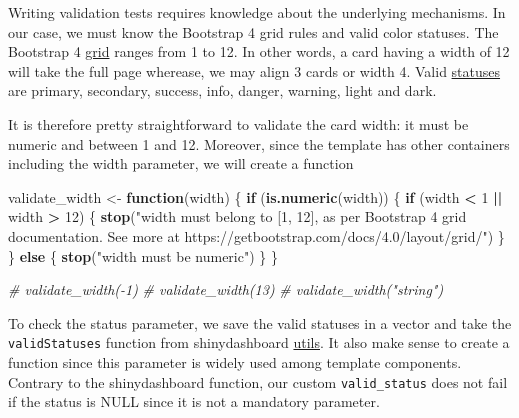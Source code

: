 \documentclass[
]{book}
\newenvironment{Shaded}{\begin{snugshade}}{\end{snugshade}}
\newcommand{\CommentTok}[1]{\textcolor[rgb]{0.56,0.35,0.01}{\textit{#1}}}
\newcommand{\ControlFlowTok}[1]{\textcolor[rgb]{0.13,0.29,0.53}{\textbf{#1}}}
\newcommand{\DecValTok}[1]{\textcolor[rgb]{0.00,0.00,0.81}{#1}}
\newcommand{\KeywordTok}[1]{\textcolor[rgb]{0.13,0.29,0.53}{\textbf{#1}}}
\newcommand{\NormalTok}[1]{#1}
\newcommand{\OperatorTok}[1]{\textcolor[rgb]{0.81,0.36,0.00}{\textbf{#1}}}
\newcommand{\StringTok}[1]{\textcolor[rgb]{0.31,0.60,0.02}{#1}}
\begin{document}
Writing validation tests requires knowledge about the underlying mechanisms. In our case, we must know the Bootstrap 4 grid rules and valid color statuses. The Bootstrap 4 \href{https://getbootstrap.com/docs/4.0/layout/grid/}{grid} ranges from 1 to 12. In other words, a card having a width of 12 will take the full page wherease, we may align 3 cards or width 4. Valid \href{https://getbootstrap.com/docs/4.0/utilities/colors/}{statuses} are primary, secondary, success, info, danger, warning, light and dark.

It is therefore pretty straightforward to validate the card width: it must be numeric and between 1 and 12. Moreover, since the template has other containers including the width parameter, we will create a function

\begin{Shaded}
\begin{Highlighting}[]
\NormalTok{validate_width <-}\StringTok{ }\ControlFlowTok{function}\NormalTok{(width) \{}
  \ControlFlowTok{if}\NormalTok{ (}\KeywordTok{is.numeric}\NormalTok{(width)) \{}
    \ControlFlowTok{if}\NormalTok{ (width }\OperatorTok{<}\StringTok{ }\DecValTok{1} \OperatorTok{||}\StringTok{ }\NormalTok{width }\OperatorTok{>}\StringTok{ }\DecValTok{12}\NormalTok{) \{}
      \KeywordTok{stop}\NormalTok{(}\StringTok{"width must belong to [1, 12], as per Bootstrap 4 grid documentation. See more at https://getbootstrap.com/docs/4.0/layout/grid/"}\NormalTok{)}
\NormalTok{    \}}
\NormalTok{  \} }\ControlFlowTok{else}\NormalTok{ \{}
    \KeywordTok{stop}\NormalTok{(}\StringTok{"width must be numeric"}\NormalTok{)}
\NormalTok{  \}}
\NormalTok{\}}

\CommentTok{# validate_width(-1)}
\CommentTok{# validate_width(13)}
\CommentTok{# validate_width("string")}
\end{Highlighting}
\end{Shaded}

To check the status parameter, we save the valid statuses in a vector and take the \texttt{validStatuses} function from shinydashboard \href{https://github.com/rstudio/shinydashboard/blob/master/R/utils.R}{utils}. It also make sense to create a function since this parameter is widely used among template components. Contrary to the shinydashboard function, our custom \texttt{valid\_status} does not fail if the status is NULL since it is not a mandatory parameter.
\end{document}
